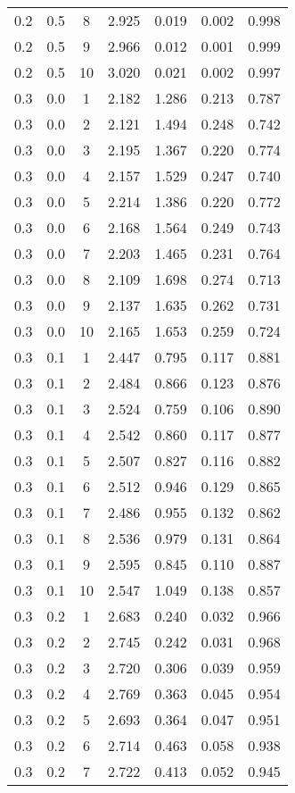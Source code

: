 \begin{tabular}{|c|c|c|c|c|c|c|}
0.2 & 0.5 & 8 & 2.925 & 0.019 & 0.002 & 0.998 \\
0.2 & 0.5 & 9 & 2.966 & 0.012 & 0.001 & 0.999 \\
0.2 & 0.5 & 10 & 3.020 & 0.021 & 0.002 & 0.997 \\
0.3 & 0.0 & 1 & 2.182 & 1.286 & 0.213 & 0.787 \\
0.3 & 0.0 & 2 & 2.121 & 1.494 & 0.248 & 0.742 \\
0.3 & 0.0 & 3 & 2.195 & 1.367 & 0.220 & 0.774 \\
0.3 & 0.0 & 4 & 2.157 & 1.529 & 0.247 & 0.740 \\
0.3 & 0.0 & 5 & 2.214 & 1.386 & 0.220 & 0.772 \\
0.3 & 0.0 & 6 & 2.168 & 1.564 & 0.249 & 0.743 \\
0.3 & 0.0 & 7 & 2.203 & 1.465 & 0.231 & 0.764 \\
0.3 & 0.0 & 8 & 2.109 & 1.698 & 0.274 & 0.713 \\
0.3 & 0.0 & 9 & 2.137 & 1.635 & 0.262 & 0.731 \\
0.3 & 0.0 & 10 & 2.165 & 1.653 & 0.259 & 0.724 \\
0.3 & 0.1 & 1 & 2.447 & 0.795 & 0.117 & 0.881 \\
0.3 & 0.1 & 2 & 2.484 & 0.866 & 0.123 & 0.876 \\
0.3 & 0.1 & 3 & 2.524 & 0.759 & 0.106 & 0.890 \\
0.3 & 0.1 & 4 & 2.542 & 0.860 & 0.117 & 0.877 \\
0.3 & 0.1 & 5 & 2.507 & 0.827 & 0.116 & 0.882 \\
0.3 & 0.1 & 6 & 2.512 & 0.946 & 0.129 & 0.865 \\
0.3 & 0.1 & 7 & 2.486 & 0.955 & 0.132 & 0.862 \\
0.3 & 0.1 & 8 & 2.536 & 0.979 & 0.131 & 0.864 \\
0.3 & 0.1 & 9 & 2.595 & 0.845 & 0.110 & 0.887 \\
0.3 & 0.1 & 10 & 2.547 & 1.049 & 0.138 & 0.857 \\
0.3 & 0.2 & 1 & 2.683 & 0.240 & 0.032 & 0.966 \\
0.3 & 0.2 & 2 & 2.745 & 0.242 & 0.031 & 0.968 \\
0.3 & 0.2 & 3 & 2.720 & 0.306 & 0.039 & 0.959 \\
0.3 & 0.2 & 4 & 2.769 & 0.363 & 0.045 & 0.954 \\
0.3 & 0.2 & 5 & 2.693 & 0.364 & 0.047 & 0.951 \\
0.3 & 0.2 & 6 & 2.714 & 0.463 & 0.058 & 0.938 \\
0.3 & 0.2 & 7 & 2.722 & 0.413 & 0.052 & 0.945 \\

\end{tabular}
